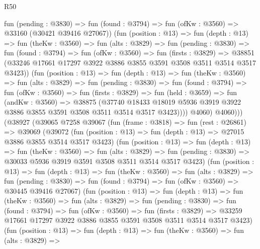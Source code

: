 \begin{lexlean}{R50}
\begin{coremodule}
                fun (pending : @3830) =>
                fun (found : @3794) => fun (ofKw : @3560) => @33160 (@30421 @39416 @27067))
                (fun (position : @13) =>
                fun (depth : @13) =>
                fun (theKw : @3560) =>
                fun (alts : @3829) =>
                fun (pending : @3830) =>
                fun (found : @3794) =>
                fun (ofKw : @3560) =>
                fun (firsts : @3829) =>
                @38851 (@33246 @17661 @17297 @3922 @3886 @3855 @3591 @3508 @3511 @3514 @3517 @3423))
                (fun (position : @13) =>
                fun (depth : @13) =>
                fun (theKw : @3560) =>
                fun (alts : @3829) =>
                fun (pending : @3830) =>
                fun (found : @3794) =>
                fun (ofKw : @3560) =>
                fun (firsts : @3829) =>
                fun (held : @3659) =>
                fun (andKw : @3560) =>
                @38875
                  (@37740
                    @18433
                    @18019
                    @5936
                    @3919
                    @3922
                    @3886
                    @3855
                    @3591
                    @3508
                    @3511
                    @3514
                    @3517
                    @3423))))
            @4060)
          @4060)))
    (@38927
      (@39065
        @7258
        @39067
        (fun (frame : @3818) =>
        fun (rest : @26861) =>
        @39069
          (@39072
            (fun (position : @13) => fun (depth : @13) => @27015 @3886 @3855 @3514 @3517 @3423)
            (fun (position : @13) =>
            fun (depth : @13) =>
            fun (theKw : @3560) =>
            fun (alts : @3829) =>
            fun (pending : @3830) => @30033 @5936 @3919 @3591 @3508 @3511 @3514 @3517 @3423)
            (fun (position : @13) =>
            fun (depth : @13) =>
            fun (theKw : @3560) =>
            fun (alts : @3829) =>
            fun (pending : @3830) =>
            fun (found : @3794) => fun (ofKw : @3560) => @30445 @39416 @27067)
            (fun (position : @13) =>
            fun (depth : @13) =>
            fun (theKw : @3560) =>
            fun (alts : @3829) =>
            fun (pending : @3830) =>
            fun (found : @3794) =>
            fun (ofKw : @3560) =>
            fun (firsts : @3829) =>
            @33259 @17661 @17297 @3922 @3886 @3855 @3591 @3508 @3511 @3514 @3517 @3423)
            (fun (position : @13) =>
            fun (depth : @13) =>
            fun (theKw : @3560) =>
            fun (alts : @3829) =>

\end{coremodule}
\end{lexlean}
